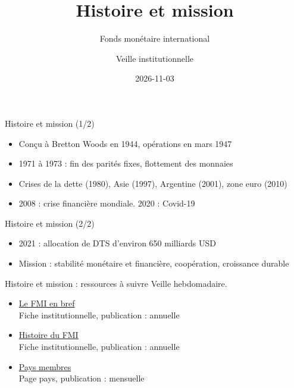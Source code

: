 \documentclass[aspectratio=169,11pt]{beamer}
\title{Histoire et mission}
\subtitle{Fonds monétaire international}
\author{Veille institutionnelle}
\date{2026-11-03}
\begin{document}
\begin{frame}\titlepage\end{frame}

\begin{frame}{Histoire et mission (1/2)}
\begin{itemize}
\item Conçu à Bretton Woods en 1944, opérations en mars 1947
\item 1971 à 1973 : fin des parités fixes, flottement des monnaies
\item Crises de la dette (1980), Asie (1997), Argentine (2001), zone euro (2010)
\item 2008 : crise financière mondiale. 2020 : Covid-19
\end{itemize}
\end{frame}

\begin{frame}{Histoire et mission (2/2)}
\begin{itemize}
\item 2021 : allocation de DTS d'environ 650 milliards USD
\item Mission : stabilité monétaire et financière, coopération, croissance durable
\end{itemize}
\end{frame}

\begin{frame}{Histoire et mission : ressources à suivre}
\small
Veille hebdomadaire.
\begin{itemize}
\item \href{https://www.imf.org/en/About/Factsheets/Sheets/2023/IMF-at-a-glance}{Le FMI en bref}\\{\footnotesize Fiche institutionnelle, publication : annuelle}
\item \href{https://www.imf.org/en/About/Factsheets/Sheets/2016/08/01/14/45/The-IMF-and-the-World-Bank}{Histoire du FMI}\\{\footnotesize Fiche institutionnelle, publication : annuelle}
\item \href{https://www.imf.org/en/Countries}{Pays membres}\\{\footnotesize Page pays, publication : mensuelle}
\end{itemize}
\end{frame}
\end{document}
